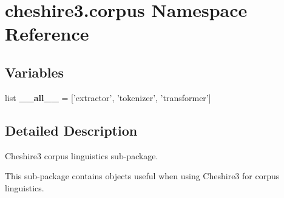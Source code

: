 \hypertarget{namespacecheshire3_1_1corpus}{\section{cheshire3.\-corpus Namespace Reference}
\label{namespacecheshire3_1_1corpus}
}
\subsection*{Variables}
\begin{DoxyCompactItemize}
\item 
\hypertarget{namespacecheshire3_1_1corpus_a99a7e3b3ba4695bef3635a5df9978283}{list {\bfseries \-\_\-\-\_\-all\-\_\-\-\_\-} = \mbox{[}'extractor', 'tokenizer', 'transformer'\mbox{]}}\label{namespacecheshire3_1_1corpus_a99a7e3b3ba4695bef3635a5df9978283}

\end{DoxyCompactItemize}


\subsection{Detailed Description}
\begin{DoxyVerb}Cheshire3 corpus linguistics sub-package.

This sub-package contains objects useful when using Cheshire3 for corpus
linguistics.
\end{DoxyVerb}
 